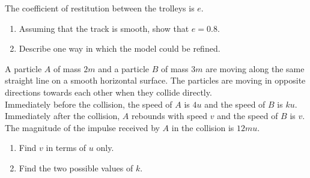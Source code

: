 \documentclass[leqno]{article}
\begin{document}
\begin{enumerate}[
  label=\textbf{\arabic*.},
  leftmargin=*,
  topsep=0pt,
  partopsep=0pt,
  parsep=0pt
]
The coefficient of restitution between the trolleys is $e$. \\
\begin{enumerate}[label=\textbf{(\alph*)}]
  \item Assuming that the track is smooth, show that $e=0.8$.  \\
  \item Describe one way in which the model could be refined.  \\
\end{enumerate}

\newpage

\questionitem

A particle $A$ of mass $2m$ and a particle $B$ of mass $3m$ are moving along the same straight line on a smooth horizontal surface. The particles are moving in opposite directions towards each other when they collide directly. \\

Immediately before the collision, the speed of $A$ is $4u$ and the speed of $B$ is $ku$. \\
Immediately after the collision, $A$ rebounds with speed $v$ and the speed of $B$ is $v$. \\

The magnitude of the impulse received by $A$ in the collision is $12mu$. \\
\begin{enumerate}[label=\textbf{(\alph*)}]
  \item Find $v$ in terms of $u$ only.  \\
  \item Find the two possible values of $k$.  \\
\end{enumerate}

\newpage


\questionitem


\end{enumerate}
\end{document}

